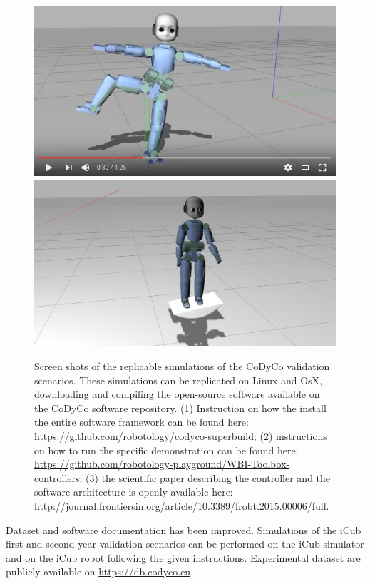 \documentclass[12pt,a4paper,twoside]{article}
\begin{document}
\begin{figure}[h]
  \centering
    \includegraphics[width=.4\textwidth]{images/yogaSim.jpg} \qquad
	\includegraphics[width=.4\textwidth]{images/seesawSim.jpg}
  \caption{Screen shots of the replicable simulations of the CoDyCo validation scenarios. These simulations can be replicated on Linux and   OsX, downloading and compiling the open-source software available on the CoDyCo software repository. (1) Instruction on how   the install the entire software framework can be found here: \protect\url{https://github.com/robotology/codyco-superbuild};   (2) instructions on how to run the specific demonstration can be found here: \protect\url{https://github.com/robotology-playground/WBI-Toolbox-controllers}; (3) the scientific paper describing the controller and the software architecture is openly available here:   \protect\url{http://journal.frontiersin.org/article/10.3389/frobt.2015.00006/full}.}
  \label{fig:images_yogaSim}
\end{figure}


\noindent
{}

\medskip
\noindent 
Dataset and software documentation has been improved. Simulations of the iCub first and second year validation scenarios can be performed on the iCub simulator and on the iCub robot following the given instructions. Experimental dataset are publicly available on \url{https://db.codyco.eu}.
\end{document}
